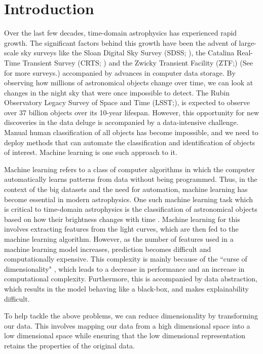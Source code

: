 \documentclass[conference]{IEEEtran}
\begin{document}
\section{Introduction}
Over the last few decades, time-domain astrophysics has experienced rapid growth. The significant factors behind this growth have been the advent of large-scale sky surveys like the Sloan Digital Sky Survey (SDSS; \cite{yorkSloanDigitalSky2000}), the Catalina Real-Time Transient Survey (CRTS; \cite{djorgovskiCatalinaRealTimeTransient2011}) and the Zwicky Transient Facility (ZTF;\cite{bellmZwickyTransientFacility2019}) (See \cite{Djorgovski2013} for more surveys.) accompanied by advances in computer data storage. By observing how millions of astronomical objects change over time, we can look at changes in the night sky that were once impossible to detect. The Rubin Observatory Legacy Survey of Space and Time (LSST;\cite{ivezicLSSTScienceDrivers2019}), is expected to observe over 37 billion objects over its 10-year lifespan. However, this opportunity for new discoveries in the data deluge is accompanied by a data-intensive challenge. Manual human classification of all objects has become impossible, and we need to deploy methods that can automate the classification and identification of objects of interest. Machine learning is one such approach to it.

Machine learning refers to a class of computer algorithms in which the computer automatically learns patterns from data without being programmed. Thus, in the context of the big datasets and the need for automation, machine learning has become essential in modern astrophysics. One such machine learning task which is critical to time-domain astrophysics is the classification of astronomical objects based on how their brightness changes with time
. Machine learning for this involves extracting features from the light curves, which are then fed to the machine learning algorithm. However, as the number of features used in a machine learning model increases, prediction becomes difficult and computationally expensive. This complexity is mainly because of the ``curse of dimensionality" \cite{bishopPatternRecognitionMachine2006}, which leads to a decrease in performance and an increase in computational complexity. Furthermore, this is accompanied by data abstraction, which results in the model behaving like a black-box, and makes explainability difficult.

To help tackle the above problems, we can reduce dimensionality by transforming our data. This involves mapping our data from a high dimensional space into a low dimensional space while ensuring that the low dimensional representation retains the properties of the original data.
\end{document}
